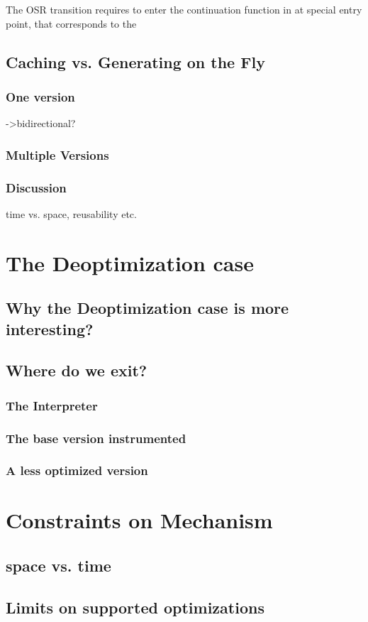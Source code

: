 The OSR transition requires to enter the continuation function in at special entry point, that corresponds to the  


\subsection{Caching vs. Generating on the Fly}
\subsubsection{One version}
->bidirectional?
\subsubsection{Multiple Versions}
\subsubsection{Discussion}
time vs. space, reusability etc.

\section{The Deoptimization case}

\subsection{Why the Deoptimization case is more interesting?}

\subsection{Where do we exit?}
\subsubsection{The Interpreter}
\subsubsection{The base version instrumented}
\subsubsection{A less optimized version}

\section{Constraints on Mechanism}
\subsection{space vs. time}
\subsection{Limits on supported optimizations}


